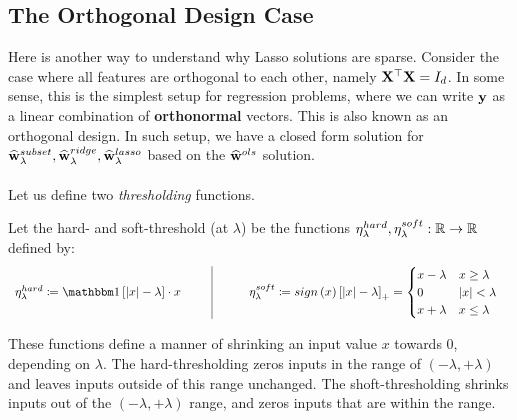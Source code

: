 \subsection{The Orthogonal Design Case}
Here is another way to understand why Lasso solutions are sparse. Consider the case where all features are orthogonal to each other, namely $\mathbf{X}^\top\mathbf{X}=I_d$. In some sense, this is the simplest setup for regression problems, where we can write $\mathbf{y}$ as a linear combination of \textbf{orthonormal} vectors. This is also known as an orthogonal design. In such setup, we have a closed form solution for $\widehat{\mathbf{w}}^{subset}_{\lambda},\widehat{\mathbf{w}}^{ridge}_{\lambda},\widehat{\mathbf{w}}^{lasso}_{\lambda}$ based on the $\widehat{\mathbf{w}}^{ols}$ solution.
\\~\\
Let us define two \textit{thresholding} functions.
\begin{definition}
Let the hard- and soft-threshold (at $\lambda$) be the functions $\eta_\lambda^{hard},\eta_\lambda^{soft}:\mathbb{R}\rightarrow\mathbb{R}$ defined by:$$
\begin{array}{cc|cc}
\eta^{hard}_\lambda\coloneqq\indc{\left|x\right|-\lambda}\cdot x & \quad & \quad &
\begin{array}{ccc}
\eta_\lambda^{soft}\coloneqq sign\left(x\right)\left[\left|x\right|-\lambda\right]_+=
\begin{cases}
	x-\lambda & x\geq \lambda	\\
	0 & \left|x\right|<\lambda\\
	x+\lambda & x\leq \lambda\\
\end{cases}
\end{array}
\end{array}
$$
\end{definition}
These functions define a manner of shrinking an input value $x$ towards $0$, depending on $\lambda$. The hard-thresholding zeros inputs in the range of $\left(-\lambda,+\lambda\right)$ and leaves inputs outside of this range unchanged. The shoft-thresholding shrinks inputs out of the $\left(-\lambda,+\lambda\right)$ range, and zeros inputs that are within the range.

